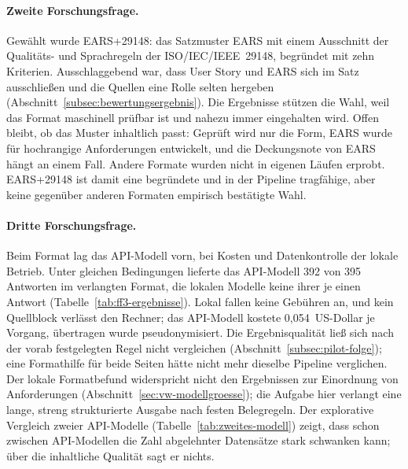 \documentclass[11pt,a4paper]{report}
\begin{document}
\paragraph{Zweite Forschungsfrage.} Gewählt wurde EARS+29148: das
Satzmuster EARS mit einem Ausschnitt der Qualitäts- und Sprachregeln der
ISO/IEC/IEEE~29148, begründet mit zehn Kriterien. Ausschlaggebend war,
dass User Story und EARS sich im Satz ausschließen und die Quellen eine
Rolle selten hergeben (Abschnitt~\ref{subsec:bewertungsergebnis}). Die
Ergebnisse stützen die Wahl, weil das Format maschinell prüfbar ist und
nahezu immer eingehalten wird. Offen bleibt, ob das Muster inhaltlich
passt: Geprüft wird nur die Form, EARS wurde für hochrangige Anforderungen
entwickelt, und die Deckungsnote von EARS hängt an einem Fall.
Andere Formate wurden nicht in eigenen Läufen erprobt. EARS+29148 ist
damit eine begründete und in der Pipeline tragfähige, aber keine
gegenüber anderen Formaten empirisch bestätigte Wahl.

\paragraph{Dritte Forschungsfrage.} Beim Format lag das API-Modell vorn,
bei Kosten und Datenkontrolle der lokale Betrieb. Unter gleichen
Bedingungen lieferte das API-Modell 392 von 395 Antworten im verlangten
Format, die lokalen Modelle keine ihrer je einen Antwort
(Tabelle~\ref{tab:ff3-ergebnisse}). Lokal fallen keine Gebühren an, und
kein Quellblock verlässt den Rechner; das API-Modell kostete
0,054~US-Dollar je Vorgang, übertragen wurde pseudonymisiert. Die
Ergebnisqualität ließ sich nach der vorab festgelegten Regel nicht
vergleichen (Abschnitt~\ref{subsec:pilot-folge}); eine Formathilfe
für beide Seiten hätte nicht mehr dieselbe Pipeline verglichen. Der
lokale Formatbefund widerspricht nicht den
Ergebnissen zur Einordnung von Anforderungen
(Abschnitt~\ref{sec:vw-modellgroesse}); die Aufgabe hier verlangt eine
lange, streng strukturierte Ausgabe nach festen Belegregeln. Der explorative Vergleich zweier API-Modelle
(Tabelle~\ref{tab:zweites-modell}) zeigt, dass schon zwischen
API-Modellen die Zahl abgelehnter Datensätze stark schwanken kann; über
die inhaltliche Qualität sagt er nichts.
\end{document}
